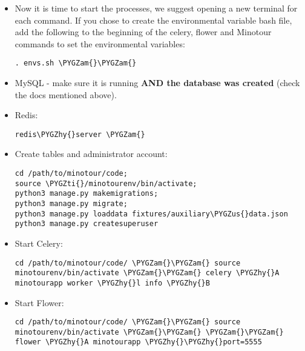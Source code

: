 \documentclass[letterpaper,10pt,english]{sphinxmanual}
\def\PYGZus{\char`\_}
\def\PYGZam{\char`\&}
\def\PYGZhy{\char`\-}
\def\PYGZti{\char`\~}
\begin{document}
\begin{itemize}
\item {} 
Now it is time to start the processes, we suggest opening a new terminal for each command. If you chose to create the environmental variable bash file, add the following to the beginning of the celery, flower and Minotour commands to set the environmental variables:

\begin{Verbatim}[commandchars=\\\{\}]
. envs.sh \PYGZam{}\PYGZam{}
\end{Verbatim}

\item {} 
MySQL - make sure it is running \textbf{AND the database was created} (check the docs mentioned above).

\item {} 
Redis:

\begin{Verbatim}[commandchars=\\\{\}]
redis\PYGZhy{}server \PYGZam{}
\end{Verbatim}

\item {} 
Create tables and administrator account:

\begin{Verbatim}[commandchars=\\\{\}]
cd /path/to/minotour/code;
source \PYGZti{}/minotourenv/bin/activate;
python3 manage.py makemigrations;
python3 manage.py migrate;
python3 manage.py loaddata fixtures/auxiliary\PYGZus{}data.json
python3 manage.py createsuperuser
\end{Verbatim}

\item {} 
Start Celery:

\begin{Verbatim}[commandchars=\\\{\}]
cd /path/to/minotour/code/ \PYGZam{}\PYGZam{} source minotourenv/bin/activate \PYGZam{}\PYGZam{} celery \PYGZhy{}A minotourapp worker \PYGZhy{}l info \PYGZhy{}B
\end{Verbatim}

\item {} 
Start Flower:

\begin{Verbatim}[commandchars=\\\{\}]
cd /path/to/minotour/code/ \PYGZam{}\PYGZam{} source minotourenv/bin/activate \PYGZam{}\PYGZam{} \PYGZam{}\PYGZam{} flower \PYGZhy{}A minotourapp \PYGZhy{}\PYGZhy{}port=5555
\end{Verbatim}


\end{itemize}
\end{document}
